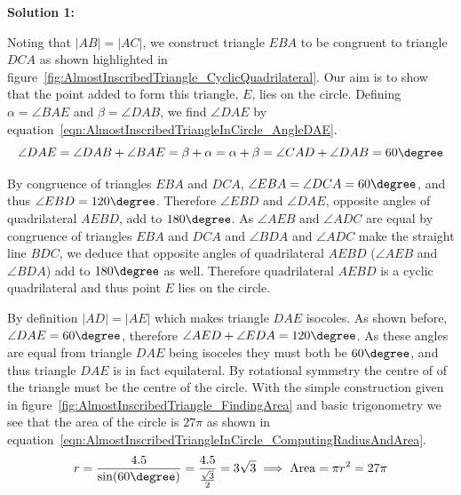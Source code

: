 \textbf{Solution 1:}

Noting that $|AB| = |AC|$, we construct triangle $EBA$ to be congruent to triangle $DCA$ as shown highlighted in figure~\ref{fig:AlmostInscribedTriangle_CyclicQuadrilateral}. Our aim is to show that the point added to form this triangle, $E$, lies on the circle. Defining $\alpha = \angle BAE$ and $\beta = \angle DAB$, we find $\angle DAE$ by equation~\eqref{eqn:AlmostInscribedTriangleInCircle_AngleDAE}.
\begin{equation}
	\angle DAE = \angle DAB + \angle BAE = \beta + \alpha = \alpha + \beta = \angle CAD + \angle DAB = 60\degree
	\label{eqn:AlmostInscribedTriangleInCircle_AngleDAE}
\end{equation}

By congruence of triangles $EBA$ and $DCA$, $\angle EBA = \angle DCA = 60\degree$, and thus $\angle EBD = 120\degree$. Therefore $\angle EBD$ and $\angle DAE$, opposite angles of quadrilateral $AEBD$, add to $180\degree$. As $\angle AEB$ and $\angle ADC$ are equal by congruence of triangles $EBA$ and $DCA$ and $\angle BDA$ and $\angle ADC$ make the straight line $BDC$, we deduce that opposite angles of quadrilateral $AEBD$ ($\angle AEB$ and $\angle BDA$) add to $180\degree$ as well. Therefore quadrilateral $AEBD$ is a cyclic quadrilateral and thus point $E$ lies on the circle.

By definition $|AD| = |AE|$ which makes triangle $DAE$ isocoles. As shown before, $\angle DAE = 60\degree$, therefore $\angle AED + \angle EDA = 120\degree$. As these angles are equal from triangle $DAE$ being isoceles they must both be $60\degree$, and thus triangle $DAE$ is in fact equilateral. By rotational symmetry the centre of of the triangle must be the centre of the circle. With the simple construction given in figure~\ref{fig:AlmostInscribedTriangle_FindingArea} and basic trigonometry we see that the area of the circle is $27\pi$ as shown in equation~\eqref{eqn:AlmostInscribedTriangleInCircle_ComputingRadiusAndArea}.
\begin{equation}
	r = \frac{4.5}{\sin(60\degree)} = \frac{4.5}{\frac{\sqrt{3}}{2}} = 3\sqrt{3} \implies \text{Area} = \pi r^2 = 27\pi
	\label{eqn:AlmostInscribedTriangleInCircle_ComputingRadiusAndArea}
\end{equation}

